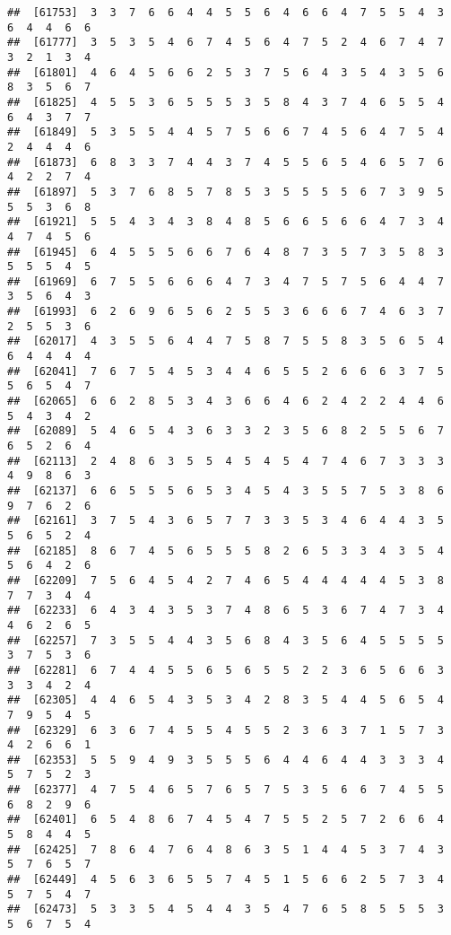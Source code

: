 \documentclass[
]{book}
\begin{document}
\begin{verbatim}
##  [61753]  3  3  7  6  6  4  4  5  5  6  4  6  6  4  7  5  5  4  3  6  4  4  6  6
##  [61777]  3  5  3  5  4  6  7  4  5  6  4  7  5  2  4  6  7  4  7  3  2  1  3  4
##  [61801]  4  6  4  5  6  6  2  5  3  7  5  6  4  3  5  4  3  5  6  8  3  5  6  7
##  [61825]  4  5  5  3  6  5  5  5  3  5  8  4  3  7  4  6  5  5  4  6  4  3  7  7
##  [61849]  5  3  5  5  4  4  5  7  5  6  6  7  4  5  6  4  7  5  4  2  4  4  4  6
##  [61873]  6  8  3  3  7  4  4  3  7  4  5  5  6  5  4  6  5  7  6  4  2  2  7  4
##  [61897]  5  3  7  6  8  5  7  8  5  3  5  5  5  5  6  7  3  9  5  5  5  3  6  8
##  [61921]  5  5  4  3  4  3  8  4  8  5  6  6  5  6  6  4  7  3  4  4  7  4  5  6
##  [61945]  6  4  5  5  5  6  6  7  6  4  8  7  3  5  7  3  5  8  3  5  5  5  4  5
##  [61969]  6  7  5  5  6  6  6  4  7  3  4  7  5  7  5  6  4  4  7  3  5  6  4  3
##  [61993]  6  2  6  9  6  5  6  2  5  5  3  6  6  6  7  4  6  3  7  2  5  5  3  6
##  [62017]  4  3  5  5  6  4  4  7  5  8  7  5  5  8  3  5  6  5  4  6  4  4  4  4
##  [62041]  7  6  7  5  4  5  3  4  4  6  5  5  2  6  6  6  3  7  5  5  6  5  4  7
##  [62065]  6  6  2  8  5  3  4  3  6  6  4  6  2  4  2  2  4  4  6  5  4  3  4  2
##  [62089]  5  4  6  5  4  3  6  3  3  2  3  5  6  8  2  5  5  6  7  6  5  2  6  4
##  [62113]  2  4  8  6  3  5  5  4  5  4  5  4  7  4  6  7  3  3  3  4  9  8  6  3
##  [62137]  6  6  5  5  5  6  5  3  4  5  4  3  5  5  7  5  3  8  6  9  7  6  2  6
##  [62161]  3  7  5  4  3  6  5  7  7  3  3  5  3  4  6  4  4  3  5  5  6  5  2  4
##  [62185]  8  6  7  4  5  6  5  5  5  8  2  6  5  3  3  4  3  5  4  5  6  4  2  6
##  [62209]  7  5  6  4  5  4  2  7  4  6  5  4  4  4  4  4  5  3  8  7  7  3  4  4
##  [62233]  6  4  3  4  3  5  3  7  4  8  6  5  3  6  7  4  7  3  4  4  6  2  6  5
##  [62257]  7  3  5  5  4  4  3  5  6  8  4  3  5  6  4  5  5  5  5  3  7  5  3  6
##  [62281]  6  7  4  4  5  5  6  5  6  5  5  2  2  3  6  5  6  6  3  3  3  4  2  4
##  [62305]  4  4  6  5  4  3  5  3  4  2  8  3  5  4  4  5  6  5  4  7  9  5  4  5
##  [62329]  6  3  6  7  4  5  5  4  5  5  2  3  6  3  7  1  5  7  3  4  2  6  6  1
##  [62353]  5  5  9  4  9  3  5  5  5  6  4  4  6  4  4  3  3  3  4  5  7  5  2  3
##  [62377]  4  7  5  4  6  5  7  6  5  7  5  3  5  6  6  7  4  5  5  6  8  2  9  6
##  [62401]  6  5  4  8  6  7  4  5  4  7  5  5  2  5  7  2  6  6  4  5  8  4  4  5
##  [62425]  7  8  6  4  7  6  4  8  6  3  5  1  4  4  5  3  7  4  3  5  7  6  5  7
##  [62449]  4  5  6  3  6  5  5  7  4  5  1  5  6  6  2  5  7  3  4  5  7  5  4  7
##  [62473]  5  3  3  5  4  5  4  4  3  5  4  7  6  5  8  5  5  5  3  5  6  7  5  4

\end{verbatim}
\end{document}
